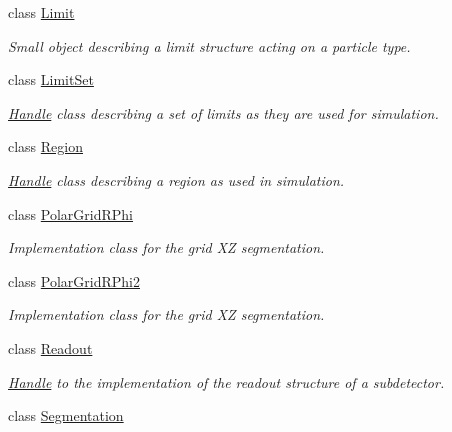\begin{DoxyCompactItemize}
class \hyperlink{class_d_d4hep_1_1_geometry_1_1_limit}{Limit}
\begin{DoxyCompactList}\small\item\em Small object describing a limit structure acting on a particle type. \item\end{DoxyCompactList}\item 
class \hyperlink{class_d_d4hep_1_1_geometry_1_1_limit_set}{LimitSet}
\begin{DoxyCompactList}\small\item\em \hyperlink{class_d_d4hep_1_1_handle}{Handle} class describing a set of limits as they are used for simulation. \item\end{DoxyCompactList}\item 
class \hyperlink{class_d_d4hep_1_1_geometry_1_1_region}{Region}
\begin{DoxyCompactList}\small\item\em \hyperlink{class_d_d4hep_1_1_handle}{Handle} class describing a region as used in simulation. \item\end{DoxyCompactList}\item 
class \hyperlink{class_d_d4hep_1_1_geometry_1_1_polar_grid_r_phi}{PolarGridRPhi}
\begin{DoxyCompactList}\small\item\em Implementation class for the grid XZ segmentation. \item\end{DoxyCompactList}\item 
class \hyperlink{class_d_d4hep_1_1_geometry_1_1_polar_grid_r_phi2}{PolarGridRPhi2}
\begin{DoxyCompactList}\small\item\em Implementation class for the grid XZ segmentation. \item\end{DoxyCompactList}\item 
class \hyperlink{class_d_d4hep_1_1_geometry_1_1_readout}{Readout}
\begin{DoxyCompactList}\small\item\em \hyperlink{class_d_d4hep_1_1_handle}{Handle} to the implementation of the readout structure of a subdetector. \item\end{DoxyCompactList}\item 
class \hyperlink{class_d_d4hep_1_1_geometry_1_1_segmentation}{Segmentation}

\end{DoxyCompactItemize}
